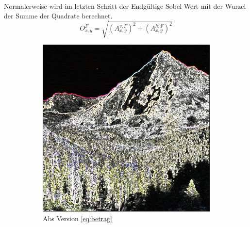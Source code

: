 \documentclass[course=erap]{aspdoc}
\begin{document}
\label{sec:rand}
\\\\
Normalerweise wird im letzten Schritt der Endgültige Sobel Wert mit der Wurzel der Summe der Quadrate berechnet.
\begin{equation}
    O^{F}_{x,y} = \sqrt{(A^{v,F}_{x,y})^2 + (A^{h,F}_{x,y})^2}
    \label{eq:wurzel}
\end{equation}
\begin{figure}[H]
    \begin{subfigure}{.5\columnwidth}
        \centering
        \includegraphics[width=\columnwidth]{graphics/johnmuirtrail_sobel.png}
        \caption{Abs Version \ref{eq:betrag}}
        \label{fig:abs-bild}
    \end{subfigure}
        \begin{subfigure}{.5\columnwidth}
        \centering

\end{subfigure}
\end{figure}
\end{document}

